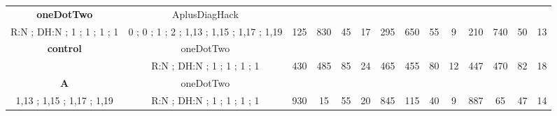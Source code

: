 \begin{table}[]
{\begin{tabular}{|c|c|c|c|c|c|c|c|c|c|c|c|c|c|}
\cellcolor{blue!15}\textbf{oneDotTwo} & AplusDiagHack& {\color[HTML]{00009B} } & {\color[HTML]{9A0000} } & {\color[HTML]{009901} } &  & {\color[HTML]{00009B} } & {\color[HTML]{9A0000} } & {\color[HTML]{009901} } &  & {\color[HTML]{00009B} } & {\color[HTML]{9A0000} } & {\color[HTML]{009901} } &  \\ 
\cellcolor{ blue!15}R:N ; DH:N ; 1 ; 1 ; 1 ; 1 & 0 ; 0 ; 1 ; 2 ; 1,13 ; 1,15 ; 1,17 ; 1,19 & \multirow{-2}{*}{{\color[HTML]{00009B} 125}} & \multirow{-2}{*}{{\color[HTML]{9A0000} 830}} & \multirow{-2}{*}{{\color[HTML]{009901} 45}} & \multirow{-2}{*}{17} & \multirow{-2}{*}{{\color[HTML]{00009B} 295}} & \multirow{-2}{*}{{\color[HTML]{9A0000} 650}} & \multirow{-2}{*}{{\color[HTML]{009901} 55}} & \multirow{-2}{*}{9} & \multirow{-2}{*}{{\color[HTML]{00009B} 210}} & \multirow{-2}{*}{{\color[HTML]{9A0000} 740}} & \multirow{-2}{*}{{\color[HTML]{009901} 50}} & \multirow{-2}{*}{13} \\ \hline

\cellcolor{blue!15}\textbf{control} & oneDotTwo& {\color[HTML]{00009B} } & {\color[HTML]{9A0000} } & {\color[HTML]{009901} } &  & {\color[HTML]{00009B} } & {\color[HTML]{9A0000} } & {\color[HTML]{009901} } &  & {\color[HTML]{00009B} } & {\color[HTML]{9A0000} } & {\color[HTML]{009901} } &  \\ 
\cellcolor{ blue!15} & R:N ; DH:N ; 1 ; 1 ; 1 ; 1 & \multirow{-2}{*}{{\color[HTML]{00009B} 430}} & \multirow{-2}{*}{{\color[HTML]{9A0000} 485}} & \multirow{-2}{*}{{\color[HTML]{009901} 85}} & \multirow{-2}{*}{24} & \multirow{-2}{*}{{\color[HTML]{00009B} 465}} & \multirow{-2}{*}{{\color[HTML]{9A0000} 455}} & \multirow{-2}{*}{{\color[HTML]{009901} 80}} & \multirow{-2}{*}{12} & \multirow{-2}{*}{{\color[HTML]{00009B} 447}} & \multirow{-2}{*}{{\color[HTML]{9A0000} 470}} & \multirow{-2}{*}{{\color[HTML]{009901} 82}} & \multirow{-2}{*}{18} \\ \hline

\cellcolor{blue!15}\textbf{A} & oneDotTwo& {\color[HTML]{00009B} } & {\color[HTML]{9A0000} } & {\color[HTML]{009901} } &  & {\color[HTML]{00009B} } & {\color[HTML]{9A0000} } & {\color[HTML]{009901} } &  & {\color[HTML]{00009B} } & {\color[HTML]{9A0000} } & {\color[HTML]{009901} } &  \\ 
\cellcolor{ blue!15}1,13 ; 1,15 ; 1,17 ; 1,19 & R:N ; DH:N ; 1 ; 1 ; 1 ; 1 & \multirow{-2}{*}{{\color[HTML]{00009B} 930}} & \multirow{-2}{*}{{\color[HTML]{9A0000} 15}} & \multirow{-2}{*}{{\color[HTML]{009901} 55}} & \multirow{-2}{*}{20} & \multirow{-2}{*}{{\color[HTML]{00009B} 845}} & \multirow{-2}{*}{{\color[HTML]{9A0000} 115}} & \multirow{-2}{*}{{\color[HTML]{009901} 40}} & \multirow{-2}{*}{9} & \multirow{-2}{*}{{\color[HTML]{00009B} 887}} & \multirow{-2}{*}{{\color[HTML]{9A0000} 65}} & \multirow{-2}{*}{{\color[HTML]{009901} 47}} & \multirow{-2}{*}{14} \\ \hline


\end{tabular}}
\end{table}
